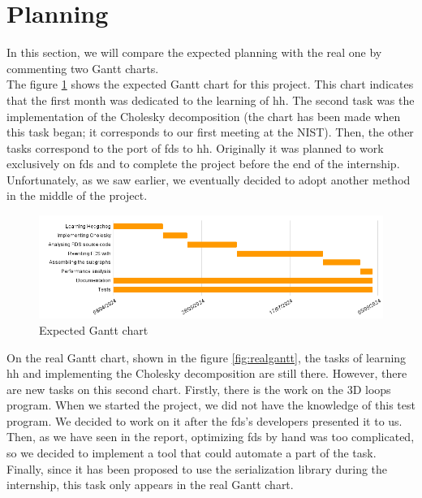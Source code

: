 
\clearpage{}
\section{Planning}

In this section, we will compare the expected planning with the real one by
commenting two Gantt charts.\\

The figure \ref{fig:expectedgantt} shows the expected Gantt chart for this
project. This chart indicates that the first month was dedicated to the learning
of \gls{hh}. The second task was the implementation of the Cholesky
decomposition (the chart has been made when this task began; it corresponds to
our first meeting at the NIST). Then, the other tasks correspond to the port of
\gls{fds} to \gls{hh}. Originally it was planned to work exclusively on
\gls{fds} and to complete the project before the end of the internship.
Unfortunately, as we saw earlier, we eventually decided to adopt another method
in the middle of the project.

\begin{figure}[h!]
  \begin{center}
    \includegraphics[scale=0.5]{img/expected-gantt-chart.png}
    \caption{Expected Gantt chart}
    \label{fig:expectedgantt}
  \end{center}
\end{figure}

On the real Gantt chart, shown in the figure \ref{fig:realgantt}, the tasks of
learning \gls{hh} and implementing the Cholesky decomposition are still there.
However, there are new tasks on this second chart. Firstly, there is the work on
the 3D loops program. When we started the project, we did not have the knowledge
of this test program. We decided to work on it after the \gls{fds}'s developers
presented it to us. Then, as we have seen in the report, optimizing \gls{fds} by
hand was too complicated, so we decided to implement a tool that could automate
a part of the task. Finally, since it has been proposed to use the serialization
library during the internship, this task only appears in the real Gantt chart.

